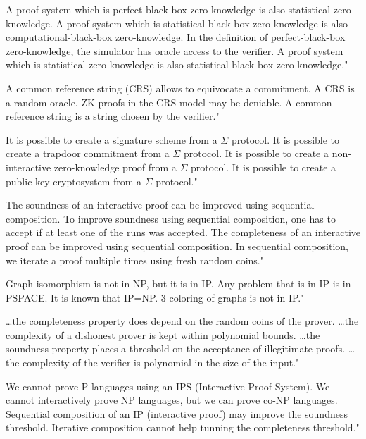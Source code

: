 {A proof system which is perfect-black-box zero-knowledge is also statistical zero-knowledge.}
{A proof system which is statistical-black-box zero-knowledge is also computational-black-box zero-knowledge.}
{In the definition of perfect-black-box zero-knowledge, the simulator has oracle access to the verifier.}
{A proof system which is statistical zero-knowledge is also statistical-black-box zero-knowledge."}

{A common reference string (CRS) allows to equivocate a commitment.}
{A CRS is a random oracle.}
{ZK proofs in the CRS model may be deniable.}
{A common reference string is a string chosen by the verifier."}

{It is possible to create a signature scheme from a $\Sigma$ protocol.}
{It is possible to create a trapdoor commitment from a $\Sigma$ protocol.}
{It is possible to create a non-interactive zero-knowledge proof from a $\Sigma$ protocol.}
{It is possible to create a public-key cryptosystem from a $\Sigma$ protocol."}

{The soundness of an interactive proof can be improved using sequential composition.}
{To improve soundness using sequential composition, one has to accept if at least one of the runs was accepted.}
{The completeness of an interactive proof can be improved using sequential composition.}
{In sequential composition, we iterate a proof multiple times using fresh random coins."}

{Graph-isomorphism is not in NP, but it is in IP.}
{Any problem that is in IP is in PSPACE.}
{It is known that IP=NP.}
{3-coloring of graphs is not in IP."}

{\ldots the completeness property does depend on the random coins of the prover.}
{\ldots the complexity of a dishonest prover is kept within polynomial bounds.}
{\ldots the soundness property places a threshold on the acceptance of illegitimate proofs.}
{\ldots the complexity of the verifier is polynomial in the size of the input."}

{We cannot prove P languages using an IPS (Interactive Proof System).}
{We cannot interactively prove NP languages, but we can prove co-NP languages.}
{Sequential composition of an IP (interactive proof) may improve the soundness threshold.}
{Iterative composition cannot help tunning the completeness threshold."}


